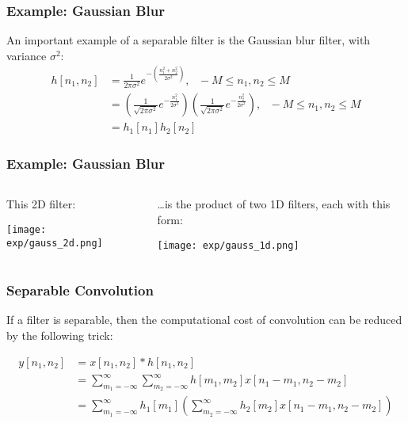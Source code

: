 \documentclass{beamer}
\begin{document}
\begin{frame}
  \frametitle{Example: Gaussian Blur}

  An important example of a separable filter is the Gaussian blur
  filter, with variance $\sigma^2$:
  \begin{align*}
    h[n_1,n_2] &= \frac{1}{2\pi\sigma^2}e^{-\left(\frac{n_1^2+n_2^2}{2\sigma^2}\right)},~~~ -M\le n_1,n_2\le M\\
    &= \left(\frac{1}{\sqrt{2\pi\sigma^2}}e^{-\frac{n_1^2}{2\sigma^2}}\right)
    \left(\frac{1}{\sqrt{2\pi\sigma^2}}e^{-\frac{n_2^2}{2\sigma^2}}\right),~~~-M\le n_1,n_2\le M\\
    &= h_1[n_1]h_2[n_2]
  \end{align*}
\end{frame}
  
\begin{frame}
  \frametitle{Example: Gaussian Blur}
  \begin{columns}
  \begin{column}{0.5\textwidth}
    This 2D filter:
    \begin{center}
      \texttt{[image: exp/gauss\_2d.png]}
    \end{center}
  \end{column}
  \begin{column}{0.5\textwidth}
    \ldots is the product of two 1D filters, each with this form:
    \begin{center}
      \texttt{[image: exp/gauss\_1d.png]}
    \end{center}
  \end{column}
  \end{columns}
\end{frame}


\begin{frame}
  \frametitle{Separable Convolution}

  If a filter is separable, then the computational cost of convolution can be reduced
  by the following trick:
  
  \begin{align*}
    y[n_1,n_2] &= x[n_1,n_2]\ast h[n_1,n_2]\\
    &= \sum_{m_1=-\infty}^\infty\sum_{m_2=-\infty}^\infty h[m_1,m_2]x[n_1-m_1,n_2-m_2]\\
    &= \sum_{m_1=-\infty}^\infty h_1[m_1]\left(\sum_{m_2=-\infty}^\infty h_2[m_2]x[n_1-m_1,n_2-m_2]\right)\\
  \end{align*}
\end{frame}
\end{document}
